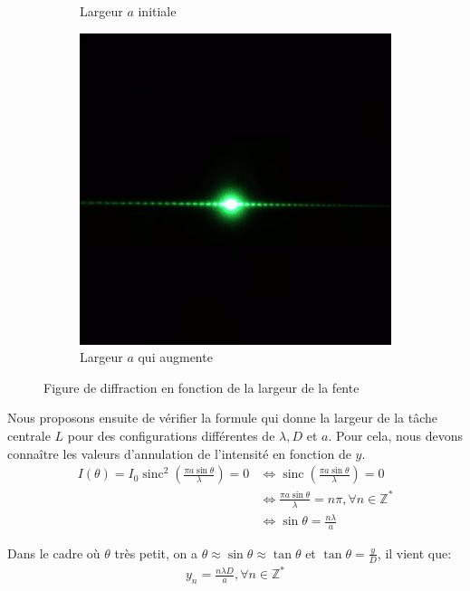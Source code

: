 \documentclass[12pt]{article}
\newcommand{\sinc}{\operatorname{sinc}}
\begin{document}
\begin{figure}[h!]
\begin{subfigure}{.33\textwidth}
      \caption{Largeur $a$ initiale}
      \label{fig:sfig2}
    \end{subfigure}
    \begin{subfigure}{.33\textwidth}
        \centering
        \includegraphics[width=.9\linewidth]{img/diffrac_simple_a_augmente.png}
        \caption{Largeur $a$ qui augmente}
        \label{fig:sfig3}
      \end{subfigure}
    \caption{Figure de diffraction en fonction de la largeur de la fente}
    \label{fig:fig}
\end{figure}

\break
Nous proposons ensuite de vérifier la formule qui donne la largeur de la tâche centrale $L$ pour des configurations différentes de $\lambda, D$ et $a$. Pour cela, nous devons
connaître les valeurs d'annulation de l'intensité en fonction de $y$.
\begin{align*}
    I(\theta) = I_0 \sinc^2\left(\frac{\pi a \sin \theta}{\lambda}\right) = 0 & \Leftrightarrow \sinc\left(\frac{\pi a \sin \theta}{\lambda}\right) = 0 \\
    & \Leftrightarrow \frac{\pi a \sin \theta}{\lambda} = n\pi, \forall n \in \mathbb{Z}^* \\
    & \Leftrightarrow \sin \theta = \frac{n\lambda}{a}
\end{align*}

Dans le cadre où $\theta$ très petit, on a $\theta \approx \sin \theta \approx \tan \theta $ et $\tan \theta = \frac{y}{D}$, il vient que:
\begin{align}
    \label{eqn:loi_intensite}
    y_n = \frac{n\lambda D}{a}, \forall n \in \mathbb{Z}^*
\end{align}
\end{document}

